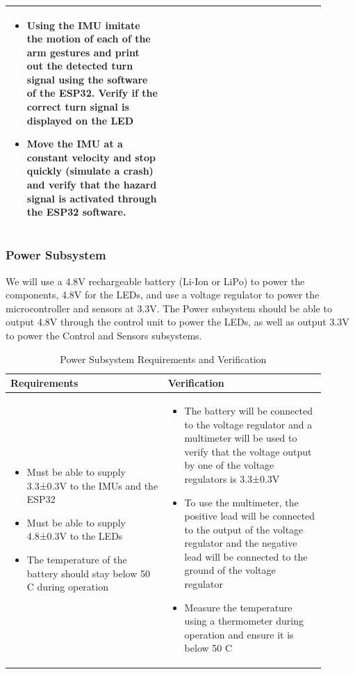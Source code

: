 \documentclass[12pt]{article}
\begin{document}
\begin{table}[h]
\begin{tabular}{p{0.45\linewidth}p{0.45\linewidth}}
\begin{itemize}[leftmargin=*, nosep, after=\strut]
            \item Using the IMU imitate the motion of each of the arm gestures and print out the detected turn signal using the software of the ESP32. Verify if the correct turn signal is displayed on the LED
            \item Move the IMU at a constant velocity and stop quickly (simulate a crash) and verify that the hazard signal is activated through the ESP32 software.
        \end{itemize} \\
        \bottomrule
        \end{tabular}
        \end{table}
    \newpage

    \subsubsection{Power Subsystem} 
	We will use a 4.8V rechargeable battery (Li-Ion or LiPo) to 
    power the components, 4.8V for the LEDs, and use a voltage 
    regulator \cite{TI2023} to power the microcontroller and sensors at 3.3V. 
    The Power subsystem should be able to output 4.8V through the control unit to power the LEDs, as well as output 3.3V to power the Control and Sensors subsystems. 
    \begin{table}[h]
        \centering
        \caption{Power Subsystem Requirements and Verification}
        \begin{tabular}{p{0.45\linewidth}p{0.45\linewidth}}
        \toprule
        \textbf{Requirements} & \textbf{Verification} \\
        \midrule
        \begin{itemize}[leftmargin=*, nosep, after=\strut]
            \item Must be able to supply 3.3±0.3V to the IMUs and the ESP32
            \item Must be able to supply 4.8±0.3V to the LEDs
            \item The temperature of the battery should stay below 50 C during operation
            
        \end{itemize} &
        \begin{itemize}[leftmargin=*, nosep, after=\strut]
            \item The battery will be connected to the voltage regulator and a multimeter will be used to verify that the voltage output by one of the voltage regulators is 3.3±0.3V
            \item To use the multimeter, the positive lead will be connected to the output of the voltage regulator and the negative lead will be connected to the ground of the voltage regulator
            \item Measure the temperature using a thermometer during operation and ensure it is below 50 C
        \end{itemize} \\
        \bottomrule
        \end{tabular}
        \end{table}
\end{document}
